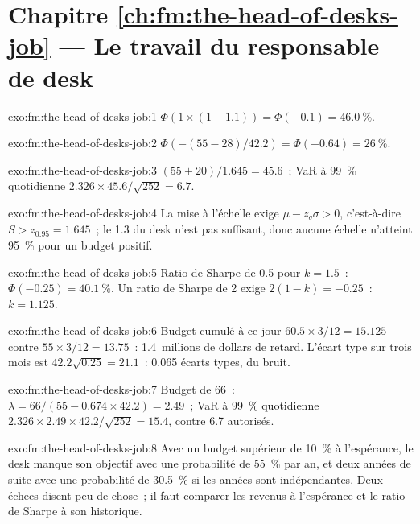 \section*{Chapitre \ref{ch:fm:the-head-of-desks-job} --- Le travail du responsable de desk}

\begin{solution}{exo:fm:the-head-of-desks-job:1}
$\Phi(1\times(1-1.1))=\Phi(-0.1)=46.0~\%$.
\end{solution}

\begin{solution}{exo:fm:the-head-of-desks-job:2}
$\Phi(-(55-28)/42.2)=\Phi(-0.64)=26~\%$.
\end{solution}

\begin{solution}{exo:fm:the-head-of-desks-job:3}
$(55+20)/1.645=45.6$~; VaR à 99~\% quotidienne $2.326\times45.6/\sqrt{252}=6.7$.
\end{solution}

\begin{solution}{exo:fm:the-head-of-desks-job:4}
La mise à l'échelle exige $\mu-z_q\sigma>0$, c'est-à-dire $S>z_{0.95}=1.645$~; le 1.3 du desk n'est pas suffisant, donc aucune échelle n'atteint 95~\% pour un budget positif.
\end{solution}

\begin{solution}{exo:fm:the-head-of-desks-job:5}
Ratio de Sharpe de 0.5 pour $k=1.5$~: $\Phi(-0.25)=40.1~\%$. Un ratio de Sharpe de 2 exige $2(1-k)=-0.25$~: $k=1.125$.
\end{solution}

\begin{solution}{exo:fm:the-head-of-desks-job:6}
Budget cumulé à ce jour $60.5\times3/12=15.125$ contre $55\times3/12=13.75$~: 1.4~millions de dollars de retard. L'écart type sur trois mois est
$42.2\sqrt{0.25}=21.1$~: 0.065 écarts types, du bruit.
\end{solution}

\begin{solution}{exo:fm:the-head-of-desks-job:7}
Budget de 66~: $\lambda=66/(55-0.674\times42.2)=2.49$~; VaR à 99~\% quotidienne $2.326\times2.49\times42.2/\sqrt{252}=15.4$, contre 6.7 autorisés.
\end{solution}

\begin{solution}{exo:fm:the-head-of-desks-job:8}
Avec un budget supérieur de 10~\% à l'espérance, le desk manque son objectif avec une probabilité de 55~\% par an, et deux années de suite avec une probabilité de 30.5~\% si les années sont
indépendantes. Deux échecs disent peu de chose~; il faut comparer les revenus à l'espérance et le ratio de Sharpe à son historique.
\end{solution}

